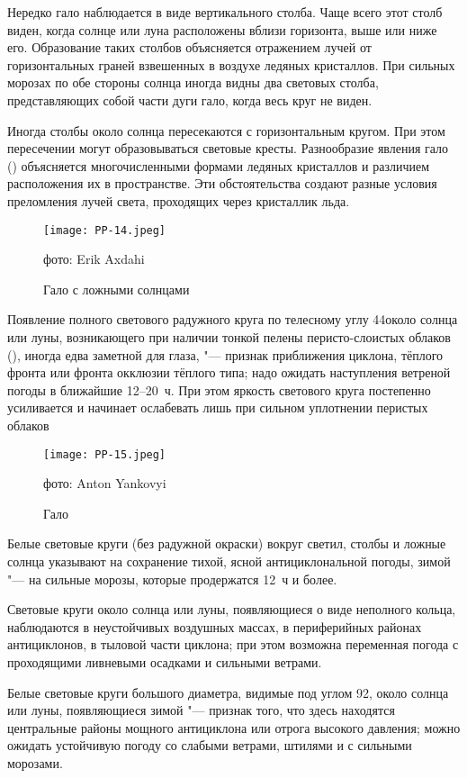 Нередко гало наблюдается в виде вертикального столба. Чаще всего этот
столб виден, когда солнце или луна расположены вблизи горизонта, выше
или ниже его. Образование таких столбов объясняется отражением лучей
от горизонтальных граней взвешенных в воздухе ледяных кристаллов. При
сильных морозах по обе стороны солнца иногда видны два световых
столба, представляющих собой части дуги гало, когда весь круг не
виден.

Иногда столбы около солнца пересекаются с горизонтальным кругом. При
этом пересечении могут образовываться световые кресты. Разнообразие
явления гало () объясняется многочисленными формами ледяных
кристаллов и различием расположения их в пространстве. Эти
обстоятельства создают разные условия преломления лучей света,
проходящих через кристаллик льда.

\begin{figure}[htb]
  \centering{}
  \texttt{[image: PP-14.jpeg]}
  \caption{Гало с ложными солнцами}
  \label{fig:pp14}
  \small
  \centering{}фото: Erik Axdahi
\end{figure}

 Появление полного светового радужного круга по телесному углу
44\gr около солнца или луны, возникающего при наличии тонкой пелены
перисто-слоистых облаков (), иногда едва заметной для
глаза, "--- признак приближения циклона, тёплого фронта или фронта
окклюзии тёплого типа; надо ожидать наступления ветреной погоды в
ближайшие 12--20~ч. При этом яркость светового круга постепенно
усиливается и начинает ослабевать лишь при сильном уплотнении перистых
облаков

\begin{figure}[htb]
  \centering{}
  \texttt{[image: PP-15.jpeg]}
  \caption{Гало}
  \label{fig:pp15}
  \small
  \centering{}фото: Anton Yankovyi
\end{figure}

 Белые световые круги (без радужной окраски) вокруг светил,
столбы и ложные солнца указывают на сохранение тихой, ясной
антициклональной погоды, зимой "--- на сильные морозы, которые продержатся
12~ч и более.

 Световые круги около солнца или луны, появляющиеся о виде
неполного кольца, наблюдаются в неустойчивых воздушных массах, в
периферийных районах антициклонов, в тыловой части циклона; при этом
возможна переменная погода с проходящими ливневыми осадками и сильными
ветрами.

 Белые световые круги большого диаметра, видимые под углом 92\gr,
около солнца или луны, появляющиеся зимой "--- признак того, что здесь
находятся центральные районы мощного антициклона или отрога высокого
давления; можно ожидать устойчивую погоду со слабыми ветрами, штилями
и с сильными морозами.

